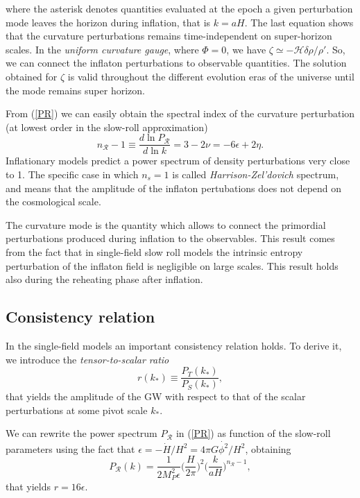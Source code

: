 \documentclass[11pt,a4paper,twoside]{book}
\begin{document}
where  the asterisk denotes quantities evaluated at the epoch a given perturbation mode leaves the horizon during inflation, that is $ k=aH $.
The last equation shows that the curvature perturbations remains  time-independent on super-horizon scales. In the \textit{uniform curvature gauge}, where $ \Phi=0 $, we have $ \zeta \simeq - \mathcal{H}\delta \rho/\rho' $. So, we can connect the inflaton perturbations to observable quantities.
The solution obtained for $\zeta$ is valid  throughout the different evolution eras of the universe until the mode remains super horizon.

From (\ref{PR}) we can easily obtain the spectral index of the curvature perturbation (at lowest order in the slow-roll approximation)
\begin{equation}
\label{spectralIndex}
n_{\mathcal{R}}-1\equiv \frac{d \ln P_{\mathcal{R}}}{d \ln k} = 3 - 2\nu=-6\epsilon + 2\eta.
\end{equation}
Inflationary models predict a power spectrum of density perturbations very close to 1. The specific case in which $ n_{s}=1 $ is called \textit{Harrison-Zel'dovich} spectrum, and means that the amplitude of the inflaton pertubations does not depend on the cosmological scale.

The curvature mode is the quantity which allows to connect the primordial perturbations produced during inflation to the observables.
This result comes from the fact that in single-field slow roll models the intrinsic entropy perturbation of the inflaton field is negligible on large scales. This result holds also during the reheating phase after inflation\cite{NonGauss:Intro}. 

\subsection{Consistency relation}
In the single-field models an important consistency relation holds. To derive it, we introduce the \textit{tensor-to-scalar ratio}
\begin{equation}
\label{tensorScalarRatio}
r(k_{*})\equiv \frac{P_{T}(k_{*})}{P_{S}(k_{*})},
\end{equation}
that yields  the amplitude of the GW with respect to that of the scalar perturbations at some pivot scale $ k_{*} $.

We can rewrite the power spectrum $ P_{\mathcal{R}} $ in (\ref{PR}) as function of the slow-roll parameters using the fact that $ \epsilon=-\dot{H}/H^{2}=4\pi G\dot{\phi^{2}}/H^{2} $, obtaining
\begin{equation}
	\label{PSRelatedToEpsilon}
P_{\mathcal{R}}(k)=\frac{1}{2M_{P}^{2}\epsilon}\Big (\frac{H}{2\pi}\Big)^{2}\Big (\frac{k}{aH}\Big)^{n_{\mathcal{R}}-1}	,
\end{equation}
that yields $ r=16\epsilon $.
\end{document}

